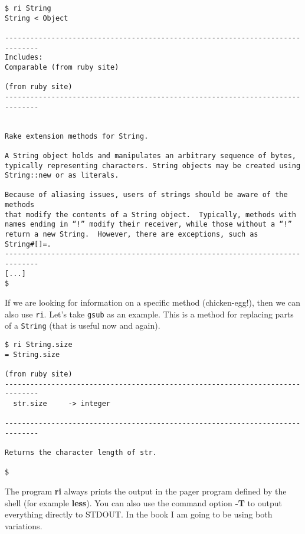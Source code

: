 \documentclass[a4paper]{book}
\begin{document}
\begin{shaded}\begin{verbatim}
$ ri String
String < Object

------------------------------------------------------------------------------
Includes:
Comparable (from ruby site)

(from ruby site)
------------------------------------------------------------------------------


Rake extension methods for String.

A String object holds and manipulates an arbitrary sequence of bytes,
typically representing characters. String objects may be created using
String::new or as literals.

Because of aliasing issues, users of strings should be aware of the methods
that modify the contents of a String object.  Typically, methods with
names ending in “!” modify their receiver, while those without a “!”
return a new String.  However, there are exceptions, such as
String#[]=.
------------------------------------------------------------------------------
[...]
$
\end{verbatim}\end{shaded}

If we are looking for information on a specific method (chicken-egg!), then we can also use \texttt{ri}. Let's take \texttt{gsub} as an example. This is a method for replacing parts of a \texttt{String} (that is useful now and again).

\begin{shaded}\begin{verbatim}
$ ri String.size
= String.size

(from ruby site)
------------------------------------------------------------------------------
  str.size     -> integer

------------------------------------------------------------------------------

Returns the character length of str.

$
\end{verbatim}\end{shaded}

The program \textbf{ri} always prints the output in the pager program defined by the shell (for example \textbf{less}). You can also use the command option \textbf{-T} to output everything directly to STDOUT. In the book I am going to be using both variations.

\end{document}

